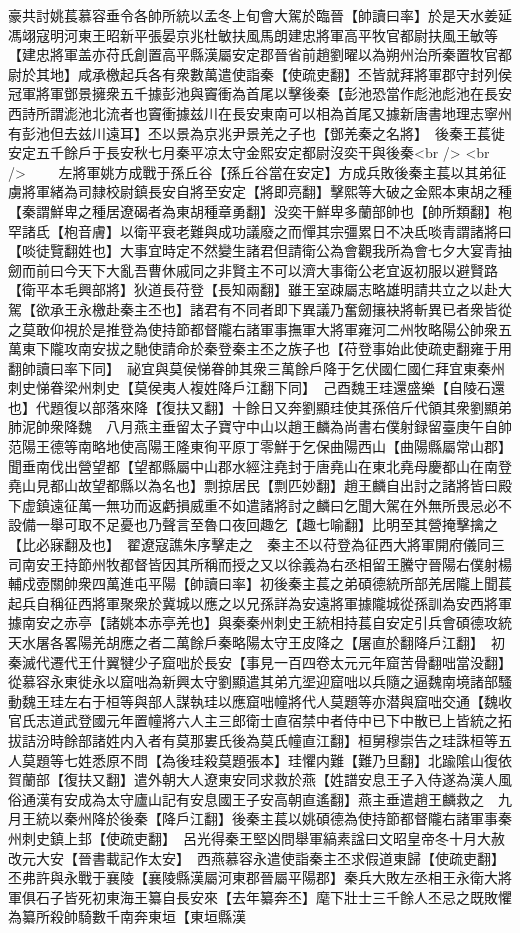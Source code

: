 豪共討姚萇慕容垂令各帥所統以孟冬上旬會大駕於臨晉【帥讀曰率】於是天水姜延馮翊寇明河東王昭新平張晏京兆杜敏扶風馬朗建忠將軍高平牧官都尉扶風王敏等【建忠將軍盖亦苻氏創置高平縣漢屬安定郡晉省前趙劉曜以為朔州治所秦置牧官都尉於其地】咸承檄起兵各有衆數萬遣使詣秦【使疏吏翻】丕皆就拜將軍郡守封列侯冠軍將軍鄧景擁衆五千據彭池與竇衝為首尾以擊後秦【彭池恐當作彪池彪池在長安西詩所謂滮池北流者也竇衝據兹川在長安東南可以相為首尾又據新唐書地理志寧州有彭池但去兹川遠耳】丕以景為京兆尹景羌之子也【鄧羌秦之名將】　後秦王萇徙安定五千餘戶于長安秋七月秦平凉太守金熙安定都尉沒奕干與後秦<br />
<br />
　　左將軍姚方成戰于孫丘谷【孫丘谷當在安定】方成兵敗後秦主萇以其弟征虜將軍緒為司隸校尉鎮長安自將至安定【將即亮翻】擊熙等大破之金熙本東胡之種【秦謂鮮卑之種居遼碣者為東胡種章勇翻】没奕干鮮卑多蘭部帥也【帥所類翻】枹罕諸氐【枹音膚】以衛平衰老難與成功議廢之而憚其宗彊累日不决氐啖青謂諸將曰【啖徒覽翻姓也】大事宜時定不然變生諸君但請衛公為會觀我所為會七夕大宴青抽劒而前曰今天下大亂吾曹休戚同之非賢主不可以濟大事衛公老宜返初服以避賢路【衛平本毛興部將】狄道長苻登【長知兩翻】雖王室疎屬志略雄明請共立之以赴大駕【欲承王永檄赴秦主丕也】諸君有不同者即下異議乃奮劒攘袂將斬異已者衆皆從之莫敢仰視於是推登為使持節都督隴右諸軍事撫軍大將軍雍河二州牧略陽公帥衆五萬東下隴攻南安拔之馳使請命於秦登秦主丕之族子也【苻登事始此使疏吏翻雍于用翻帥讀曰率下同】　祕宜與莫侯悌眷帥其衆三萬餘戶降于乞伏國仁國仁拜宜東秦州刺史悌眷梁州刺史【莫侯夷人複姓降戶江翻下同】　己酉魏王珪還盛樂【自陵石還也】代題復以部落來降【復扶又翻】十餘日又奔劉顯珪使其孫倍斤代領其衆劉顯弟肺泥帥衆降魏　八月燕主垂留太子寶守中山以趙王麟為尚書右僕射録留臺庚午自帥范陽王德等南略地使高陽王隆東徇平原丁零鮮于乞保曲陽西山【曲陽縣屬常山郡】聞垂南伐出營望都【望都縣屬中山郡水經注堯封于唐堯山在東北堯母慶都山在南登堯山見都山故望都縣以為名也】剽掠居民【剽匹妙翻】趙王麟自出討之諸將皆曰殿下虚鎮遠征萬一無功而返虧損威重不如遣諸將討之麟曰乞聞大駕在外無所畏忌必不設備一舉可取不足憂也乃聲言至魯口夜回趣乞【趣七喻翻】比明至其營掩擊擒之【比必寐翻及也】　翟遼寇譙朱序擊走之　秦主丕以苻登為征西大將軍開府儀同三司南安王持節州牧都督皆因其所稱而授之又以徐義為右丞相留王騰守晉陽右僕射楊輔戍壺關帥衆四萬進屯平陽【帥讀曰率】初後秦主萇之弟碩德統所部羌居隴上聞萇起兵自稱征西將軍聚衆於冀城以應之以兄孫詳為安遠將軍據隴城從孫訓為安西將軍據南安之赤亭【諸姚本赤亭羌也】與秦秦州刺史王統相持萇自安定引兵會碩德攻統天水屠各畧陽羌胡應之者二萬餘戶秦略陽太守王皮降之【屠直於翻降戶江翻】　初秦滅代遷代王什翼犍少子窟咄於長安【事見一百四卷太元元年窟苦骨翻咄當没翻】從慕容永東徙永以窟咄為新興太守劉顯遣其弟亢埿迎窟咄以兵隨之逼魏南境諸部騷動魏王珪左右于桓等與部人謀執珪以應窟咄幢將代人莫題等亦潜與窟咄交通【魏收官氏志道武登國元年置幢將六人主三郎衛士直宿禁中者侍中已下中散已上皆統之拓拔詰汾時餘部諸姓内入者有莫那婁氏後為莫氏幢直江翻】桓舅穆崇告之珪誅桓等五人莫題等七姓悉原不問【為後珪殺莫題張本】珪懼内難【難乃旦翻】北踰隂山復依賀蘭部【復扶又翻】遣外朝大人遼東安同求救於燕【姓譜安息王子入侍遂為漢人風俗通漢有安成為太守廬山記有安息國王子安高朝直遙翻】燕主垂遣趙王麟救之　九月王統以秦州降於後秦【降戶江翻】後秦主萇以姚碩德為使持節都督隴右諸軍事秦州刺史鎮上邽【使疏吏翻】　呂光得秦王堅凶問舉軍縞素諡曰文昭皇帝冬十月大赦改元大安【晉書載記作太安】　西燕慕容永遣使詣秦主丕求假道東歸【使疏吏翻】丕弗許與永戰于襄陵【襄陵縣漢屬河東郡晉屬平陽郡】秦兵大敗左丞相王永衛大將軍俱石子皆死初東海王纂自長安來【去年纂奔丕】麾下壯士三千餘人丕忌之既敗懼為纂所殺帥騎數千南奔東垣【東垣縣漢